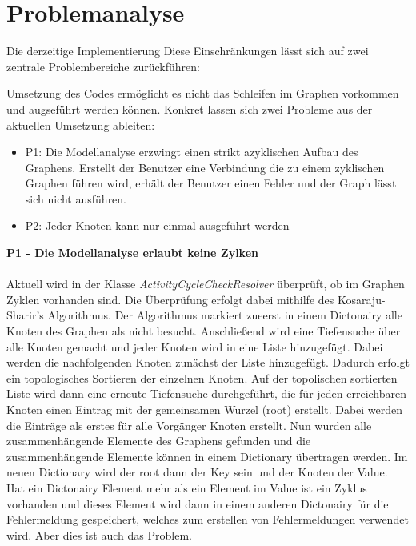     \section{Problemanalyse}
    \label{sec:problemanalyse}
        Die derzeitige Implementierung
        Diese Einschränkungen lässt sich auf zwei zentrale Problembereiche zurückführen:
        
        Umsetzung des Codes ermöglicht es nicht das Schleifen im Graphen vorkommen und augseführt werden können. 
        Konkret lassen sich zwei Probleme aus der aktuellen Umsetzung ableiten:
        \begin{itemize}
            \item P1: Die Modellanalyse erzwingt einen strikt azyklischen Aufbau des Graphens. Erstellt der Benutzer eine Verbindung die zu einem zyklischen Graphen führen wird, erhält der Benutzer einen Fehler und der Graph lässt sich nicht ausführen. 
            \item P2: Jeder Knoten kann nur einmal ausgeführt werden
        \end{itemize}
        \textbf{P1 - Die Modellanalyse erlaubt keine Zylken}\\
        \\
        Aktuell wird in der Klasse \textit{ActivityCycleCheckResolver} überprüft, ob im Graphen Zyklen vorhanden sind. 
        Die Überprüfung erfolgt dabei mithilfe des Kosaraju-Sharir's Algorithmus.
        Der Algorithmus markiert zueerst in einem Dictonairy alle Knoten des Graphen als nicht besucht. 
        Anschließend wird eine Tiefensuche über alle Knoten gemacht und jeder Knoten wird in eine Liste hinzugefügt. 
        Dabei werden die nachfolgenden Knoten zunächst der Liste hinzugefügt. 
        Dadurch erfolgt ein topologisches Sortieren der einzelnen Knoten.
        Auf der topolischen sortierten Liste wird dann eine erneute Tiefensuche durchgeführt, die für jeden erreichbaren Knoten einen Eintrag mit der gemeinsamen Wurzel (root) erstellt. 
        Dabei werden die Einträge als erstes für alle Vorgänger Knoten erstellt.
        Nun wurden alle zusammenhängende Elemente des Graphens gefunden und die zusammenhängende Elemente können in einem Dictionary übertragen werden. 
        Im neuen Dictionary wird der root dann der Key sein und der Knoten der Value.
        Hat ein Dictonairy Element mehr als ein Element im Value ist ein Zyklus vorhanden und dieses Element wird dann in einem anderen Dictonairy für die Fehlermeldung gespeichert, welches zum erstellen von Fehlermeldungen verwendet wird.
        Aber dies ist auch das Problem. 
